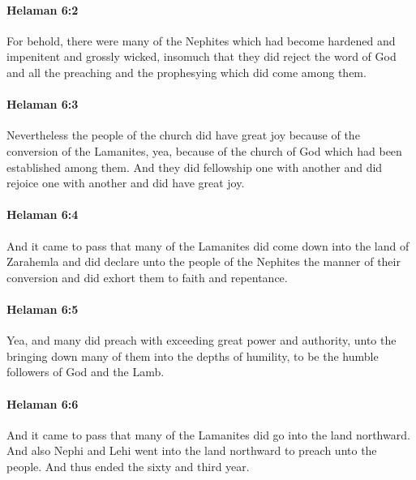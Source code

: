 		\paragraph{Helaman 6:2} %
			\label{HELAMAN-6-2}

			For behold, there were many of the Nephites
			which had become hardened and impenitent and grossly wicked,
			insomuch that they did reject the word of God
			and all the preaching and the prophesying which did come among them.

		\paragraph{Helaman 6:3} %
			\label{HELAMAN-6-3}

			Nevertheless the people of the church did have great joy
			because of the conversion of the Lamanites,
			yea, because of the church of God which had been established among them.
			And they did fellowship one with another
			and did rejoice one with another and did have great joy.

		\paragraph{Helaman 6:4} %
			\label{HELAMAN-6-4}

			And it came to pass that
			many of the Lamanites did come down into the land of Zarahemla
			and did declare unto the people of the Nephites the manner of their conversion
			and did exhort them to faith and repentance.

		\paragraph{Helaman 6:5} %
			\label{HELAMAN-6-5}

			Yea, and many did preach with exceeding great power and authority,
			unto the bringing down many of them into the depths of humility,
			to be the humble followers of God and the Lamb.

		\paragraph{Helaman 6:6} %
			\label{HELAMAN-6-6}

			And it came to pass that many of the Lamanites did go into the land northward.
			And also Nephi and Lehi went into the land northward to preach unto the people.
			And thus ended the sixty and third year.

